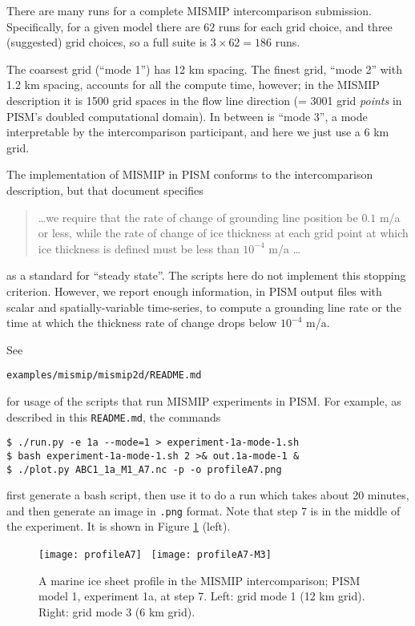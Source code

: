 There are many runs for a complete MISMIP intercomparison submission.  Specifically, for a given model there are $62$ runs for each grid choice, and three (suggested) grid choices, so a full suite is $3 \times 62 = 186$ runs.

The coarsest grid (``mode 1'') has 12 km spacing.  The finest grid, ``mode 2'' with 1.2 km spacing, accounts for all the compute time, however; in the MISMIP description it is 1500 grid spaces in the flow line direction (= 3001 grid \emph{points} in PISM's doubled computational domain).  In between is ``mode 3'', a mode interpretable by the intercomparison participant, and here we just use a 6 km grid.

The implementation of MISMIP in PISM conforms to the intercomparison description, but that document specifies
\begin{quotation}
\dots we require that the rate of change of grounding line position be $0.1$ m/a or less, while the rate of change of ice thickness at each grid point at which ice thickness is defined must be less than $10^{-4}$ m/a \dots
\end{quotation}
as a standard for ``steady state''.  The scripts here do not implement this stopping criterion.  However, we report enough information, in PISM output files with scalar and spatially-variable time-series, to compute a grounding line rate or the time at which the thickness rate of change drops below $10^{-4}$ m/a.

See

  \centerline{\texttt{examples/mismip/mismip2d/README.md}}

\noindent for usage of the scripts that run MISMIP experiments in PISM.  For example, as described in this \texttt{README.md}, the commands

\begin{verbatim}
$ ./run.py -e 1a --mode=1 > experiment-1a-mode-1.sh
$ bash experiment-1a-mode-1.sh 2 >& out.1a-mode-1 &
$ ./plot.py ABC1_1a_M1_A7.nc -p -o profileA7.png
\end{verbatim}

\noindent first generate a bash script, then use it to do a run which takes about 20 minutes, and then generate an image in \texttt{.png} format.  Note that step 7 is in the middle of the experiment.  It is shown in Figure \ref{fig:MISMIPmodel1exper1aA7} (left).
 
\begin{figure}[ht]
\centering
\texttt{[image: profileA7]} \,
\texttt{[image: profileA7-M3]}
\caption{A marine ice sheet profile in the MISMIP intercomparison; PISM model 1, experiment 1a, at step 7.  Left: grid mode 1 (12 km grid).  Right: grid mode 3 (6 km grid).}
\label{fig:MISMIPmodel1exper1aA7}
\end{figure}

